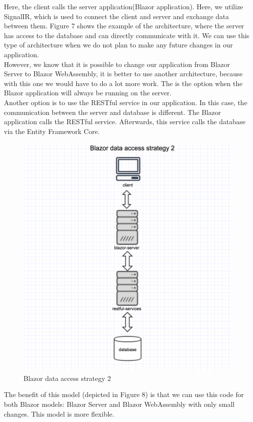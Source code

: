\documentclass{scrartcl}
\begin{document}
Here, the client calls the server application(Blazor application). Here, we utilize SignalIR, which is used to connect the client and server and exchange data between them.
Figure 7 shows the example of the architecture, where the server has access to the database and can directly communicate with it.
 We can use this type of architecture when we do not plan to make any future changes in our application.\\
However, we know that it is possible to change our application from Blazor Server to Blazor WebAssembly, it is better to use another architecture, because with this one we would have to do a lot more work.
The is the option when the Blazor application will always be running on the server.\\
Another option  is to use the RESTful service in our application.
In this case, the communication between the server and database is different.
The Blazor application calls the RESTful service. Afterwards, this service calls the database via the Entity Framework Core.\\
\begin{figure}[H]
\centering
\includegraphics[width=150mm]{data/ds2.JPG}
\caption{Blazor data access strategy 2}
\label{blabla}
\end{figure}
The benefit of this model (depicted in Figure 8) is that we can use this code for both Blazor models: Blazor Server and Blazor WebAssembly with only small changes. This model is more flexible.
\end{document}
